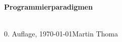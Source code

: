 \begin{titlepage}
\thispagestyle{empty}
\ifAFive
    \par\vspace{4cm}
\else
    \par\vspace{10cm}
\fi
\begin{center}
{\Large \textbf{Programmierparadigmen}}
\vfill

\vfill
\hrulefill
\end{center}
\ \\[-5ex]
0. Auflage, \today \hfill Martin Thoma
\end{titlepage}
